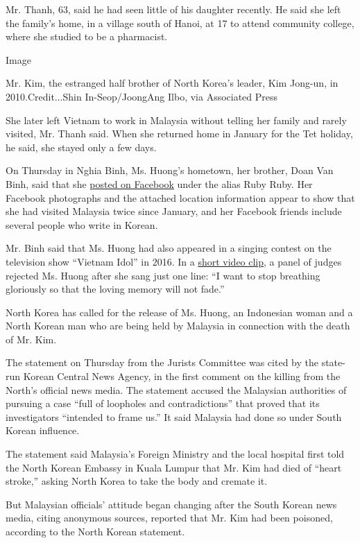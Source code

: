 Mr. Thanh, 63, said he had seen little of his daughter recently. He said
she left the family's home, in a village south of Hanoi, at 17 to attend
community college, where she studied to be a pharmacist.

Image

Mr. Kim, the estranged half brother of North Korea's leader, Kim
Jong-un, in 2010.Credit...Shin In-Seop/JoongAng Ilbo, via Associated
Press

She later left Vietnam to work in Malaysia without telling her family
and rarely visited, Mr. Thanh said. When she returned home in January
for the Tet holiday, he said, she stayed only a few days.

On Thursday in Nghia Binh, Ms. Huong's hometown, her brother, Doan Van
Binh, said that she
\href{https://www.facebook.com/profile.php?id=100014435959215\&lst=698293796\%253A100014435959215\%253A1487826179}{posted
on Facebook} under the alias Ruby Ruby. Her Facebook photographs and the
attached location information appear to show that she had visited
Malaysia twice since January, and her Facebook friends include several
people who write in Korean.

Mr. Binh said that Ms. Huong had also appeared in a singing contest on
the television show ``Vietnam Idol'' in 2016. In a
\href{http://www.youtube.com/watch?v=vZNqVandYLA}{short video clip}, a
panel of judges rejected Ms. Huong after she sang just one line: ``I
want to stop breathing gloriously so that the loving memory will not
fade.''

North Korea has called for the release of Ms. Huong, an Indonesian woman
and a North Korean man who are being held by Malaysia in connection with
the death of Mr. Kim.

The statement on Thursday from the Jurists Committee was cited by the
state-run Korean Central News Agency, in the first comment on the
killing from the North's official news media. The statement accused the
Malaysian authorities of pursuing a case ``full of loopholes and
contradictions'' that proved that its investigators ``intended to frame
us.'' It said Malaysia had done so under South Korean influence.

The statement said Malaysia's Foreign Ministry and the local hospital
first told the North Korean Embassy in Kuala Lumpur that Mr. Kim had
died of ``heart stroke,'' asking North Korea to take the body and
cremate it.

But Malaysian officials' attitude began changing after the South Korean
news media, citing anonymous sources, reported that Mr. Kim had been
poisoned, according to the North Korean statement.

